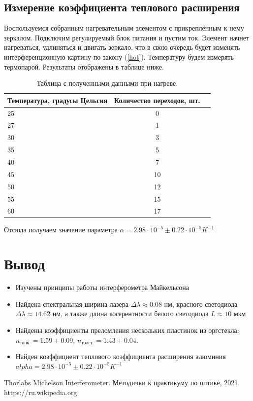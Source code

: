 \documentclass[a4paper, 12pt]{article}
\begin{document}
	\subsection*{Измерение коэффициента теплового расширения}
	Воспользуемся собранным нагревательным элементом с прикреплённым к нему зеркалом. Подключим регулируемый блок питания и пустим ток. Элемент начнет нагреваться, удлиняться и двигать зеркало, что в свою очередь будет изменять интерференционную картину по закону (\ref{hot}). Температуру будем измерять термопарой. Результаты отображены в таблице ниже.
	\begin{table}[H]
		\centering
		\caption{Таблица с полученными данными при нагреве.}
		\begin{tabular}[t]{lcc}
			\hline
			Температура, градусы Цельсия&Количество переходов, шт.\\
			\hline
			25&0\\
			27&1\\
			30&3\\
			35&5\\
			40&7\\
			45&10\\
			50&12\\
			55&15\\
			60&17\\
			\hline
		\end{tabular}
	\end{table}
	Отсюда получаем значение параметра $\alpha = 2.98 \cdot 10^{-5} \pm 0.22 \cdot 10^{-5} K^{-1}$ 
	\section*{Вывод}
	\begin{itemize}
			\item Изучены принципы работы интерферометра Майкельсона
			\item Найдена спектральная ширина лазера $\Delta \lambda \approx 0.08$ нм, красного светодиода $\Delta \lambda \approx 14.62$ нм, а также длина когерентности белого светодиода $L \approx 10$ мкм
			\item Найдены коэффициенты преломления нескольких пластинок из оргстекла: $n_{\text{тонк.}} = 1.59 \pm 0.09$, $n_{\text{толст.}} = 1.43 \pm 0.04$.
			\item Найден коэффициент теплового коэффициента расширения алюминия $alpha = 2.98 \cdot 10^{-5} \pm 0.22 \cdot 10^{-5} K^{-1}$ 
	\end{itemize}

	\begin{thebibliography}{9}
		Thorlabs Michelson Interferometer.
		Методички к практикуму по оптике, 2021.
		https://ru.wikipedia.org
	\end{thebibliography}
\end{document}
